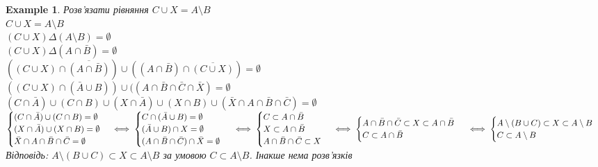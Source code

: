 \documentclass[a4paper, 14pt]{extarticle}
\theoremstyle{theoremdd}
\theoremstyle{theoremdd}
\theoremstyle{theoremdd}
\theoremstyle{theoremdd}
\newtheorem{example}[theorem]{Example}
\theoremstyle{theoremdd}
\theoremstyle{theoremdd}
\theoremstyle{theoremdd}
\theoremstyle{theoremdd}
\begin{document}
\begin{example}
Розв'язати рівняння $C \cup X = A \setminus B$\\
$C \cup X = A \setminus B$\\
$(C \cup X) \Delta (A \setminus B) = \emptyset$\\
$(C \cup X) \Delta (A \cap \bar{B}) = \emptyset$\\
$((C \cup X) \cap \overline{(A \cap \bar{B})}) \cup ((A \cap \bar{B}) \cap \overline{(C \cup X)}) = \emptyset$\\
$((C \cup X) \cap (\bar{A} \cup B)) \cup ((A \cap \bar{B} \cap \bar{C} \cap \bar{X}) = \emptyset$\\
$(C \cap \bar{A}) \cup (C \cap B) \cup (X \cap \bar{A}) \cup (X \cap B) \cup (\bar{X} \cap A \cap \bar{B} \cap \bar{C}) = \emptyset$\\
$\begin{cases}
(C \cap \bar{A}) \cup (C \cap B) = \emptyset \\
(X \cap \bar{A}) \cup (X \cap B) = \emptyset \\
\bar{X} \cap A \cap \bar{B} \cap \bar{C} = \emptyset
\end{cases} \iff
\begin{cases}
C \cap (\bar{A} \cup B) = \emptyset \\
(\bar{A} \cup B) \cap X = \emptyset \\
(A \cap \bar{B} \cap \bar{C}) \cap \bar{X} = \emptyset
\end{cases} \\
\iff
\begin{cases}
C \subset A \cap \bar{B} \\
X \subset A \cap \bar{B} \\
A \cap \bar{B} \cap \bar{C} \subset X
\end{cases} \iff
\begin{cases}
A \cap \bar{B} \cap \bar{C} \subset X \subset A \cap \bar{B} \\
C \subset A \cap \bar{B}
\end{cases} \\
\iff \begin{cases}
A \setminus (B \cup C) \subset X \subset A \setminus B \\
C \subset A \setminus B
\end{cases}$\\
Відповідь: $A \setminus (B \cup C) \subset X \subset A \setminus B$ за умовою $C \subset A \setminus B$. Інакше нема розв'язків
\end{example}
\end{document}
